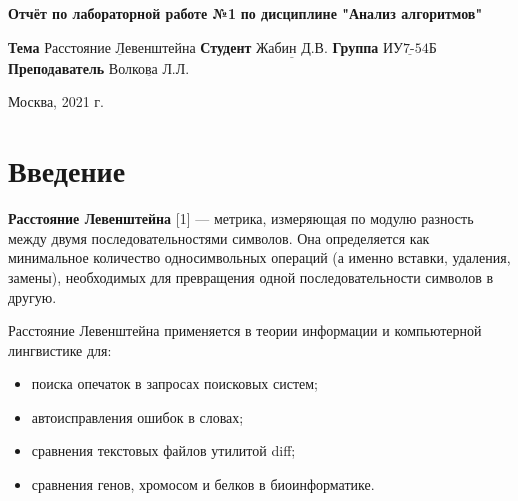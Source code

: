 \documentclass[12pt, a4paper]{report}
\begin{document}
\begin{titlepage}
	
	\begin{center}
		\noindent
			\LARGE\textbf{Отчёт по лабораторной работе №1}\newline
			\textbf{по дисциплине "Анализ алгоритмов"}\newline\newline
	\end{center}
	
	\large\noindent\textbf{Тема} $\underline{\text{Расстояние Левенштейна}}$\newline\newline
	\noindent\textbf{Студент} $\underline{\text{Жабин Д.В.}}$\newline\newline
	\noindent\textbf{Группа} $\underline{\text{ИУ7-54Б}}$\newline\newline
	\noindent\textbf{Преподаватель} $\underline{\text{Волкова Л.Л.}}$\newline\newline\newline
	
	\begin{center}
		\large\vfill
		Москва, 2021 г.
	\end{center}
\end{titlepage}

\setlength{\parindent}{1.25cm}

\setcounter{page}{2}\large\linespread{1.3}\tableofcontents

\newpage
\chapter*{Введение}

\textbf{Расстояние Левенштейна} [1] — метрика, измеряющая по модулю разность между двумя последовательностями символов. Она определяется как минимальное количество односимвольных операций (а именно вставки, удаления, замены), необходимых для превращения одной последовательности символов в другую.
\newline

Расстояние Левенштейна применяется в теории информации и компьютерной лингвистике для:

\begin{itemize}
	\item поиска опечаток в запросах поисковых систем;
	\item автоисправления ошибок в словах;
	\item сравнения текстовых файлов утилитой diff;
	\item сравнения генов, хромосом и белков в биоинформатике.
\end{itemize}
\end{document}
